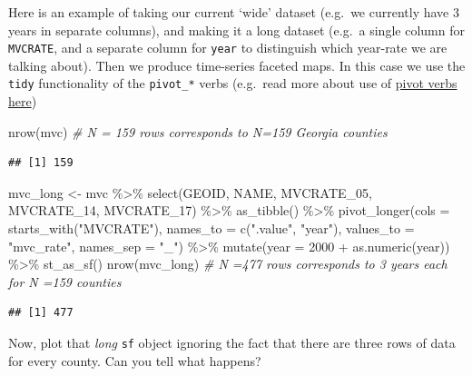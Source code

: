 \documentclass[
]{book}
\newenvironment{Shaded}{\begin{snugshade}}{\end{snugshade}}
\newcommand{\AttributeTok}[1]{\textcolor[rgb]{0.77,0.63,0.00}{#1}}
\newcommand{\CommentTok}[1]{\textcolor[rgb]{0.56,0.35,0.01}{\textit{#1}}}
\newcommand{\DecValTok}[1]{\textcolor[rgb]{0.00,0.00,0.81}{#1}}
\newcommand{\FunctionTok}[1]{\textcolor[rgb]{0.00,0.00,0.00}{#1}}
\newcommand{\NormalTok}[1]{#1}
\newcommand{\OtherTok}[1]{\textcolor[rgb]{0.56,0.35,0.01}{#1}}
\newcommand{\SpecialCharTok}[1]{\textcolor[rgb]{0.00,0.00,0.00}{#1}}
\newcommand{\StringTok}[1]{\textcolor[rgb]{0.31,0.60,0.02}{#1}}
\begin{document}
Here is an example of taking our current `wide' dataset (e.g.~we currently have 3 years in separate columns), and making it a long dataset (e.g.~a single column for \texttt{MVCRATE}, and a separate column for \texttt{year} to distinguish which year-rate we are talking about). Then we produce time-series faceted maps. In this case we use the \texttt{tidy} functionality of the \texttt{pivot\_*} verbs (e.g.~read more about use of \protect\hyperlink{pivot_}{pivot verbs here})

\begin{Shaded}
\begin{Highlighting}[]
\FunctionTok{nrow}\NormalTok{(mvc) }\CommentTok{\# N = 159 rows corresponds to N=159 Georgia counties}
\end{Highlighting}
\end{Shaded}

\begin{verbatim}
## [1] 159
\end{verbatim}

\begin{Shaded}
\begin{Highlighting}[]
\NormalTok{mvc\_long }\OtherTok{\textless{}{-}}\NormalTok{ mvc }\SpecialCharTok{\%\textgreater{}\%}
  \FunctionTok{select}\NormalTok{(GEOID, NAME, MVCRATE\_05, MVCRATE\_14, MVCRATE\_17) }\SpecialCharTok{\%\textgreater{}\%}
  \FunctionTok{as\_tibble}\NormalTok{() }\SpecialCharTok{\%\textgreater{}\%}
  \FunctionTok{pivot\_longer}\NormalTok{(}\AttributeTok{cols =} \FunctionTok{starts\_with}\NormalTok{(}\StringTok{"MVCRATE"}\NormalTok{),}
               \AttributeTok{names\_to =} \FunctionTok{c}\NormalTok{(}\StringTok{".value"}\NormalTok{, }\StringTok{"year"}\NormalTok{),}
               \AttributeTok{values\_to =} \StringTok{"mvc\_rate"}\NormalTok{,}
               \AttributeTok{names\_sep =} \StringTok{"\_"}\NormalTok{) }\SpecialCharTok{\%\textgreater{}\%}
  \FunctionTok{mutate}\NormalTok{(}\AttributeTok{year =} \DecValTok{2000} \SpecialCharTok{+} \FunctionTok{as.numeric}\NormalTok{(year)) }\SpecialCharTok{\%\textgreater{}\%}
  \FunctionTok{st\_as\_sf}\NormalTok{()}
\FunctionTok{nrow}\NormalTok{(mvc\_long) }\CommentTok{\# N =477 rows corresponds to 3 years each for N =159 counties  }
\end{Highlighting}
\end{Shaded}

\begin{verbatim}
## [1] 477
\end{verbatim}

Now, plot that \emph{long} \texttt{sf} object ignoring the fact that there are three rows of data for every county. Can you tell what happens?
\end{document}
